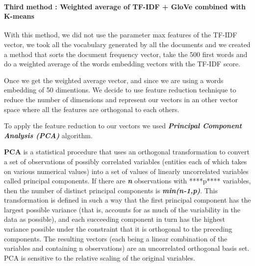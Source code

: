 \documentclass[journal,twocolumn]{IEEEtran}
\begin{document}
    \begin{figure}
        \begin{center}\end{center}
        \caption{}
        \label{}
    \end{figure}
    
    \hypertarget{third-method-weighted-average-of-tf-idf-glove-combined-with-k-means}{%
\paragraph{Third method : Weighted average of TF-IDF + GloVe combined
with
K-means}\label{third-method-weighted-average-of-tf-idf-glove-combined-with-k-means}}

With this method, we did not use the parameter max features of the
TF-IDF vector, we took all the vocabulary generated by all the documents
and we created a method that sorts the document frequency vector, take
the 500 first words and do a weighted average of the words embedding
vectors with the TF-IDF score.

Once we get the weighted average vector, and since we are using a words
embedding of 50 dimentions. We decide to use feature reduction technique
to reduce the number of dimensions and represent our vectors in an other
vector space where all the features are orthogonal to each others.

To apply the feature reduction to our vectors we used
\textbf{\emph{Principal Component Analysis (PCA)}} algorithm.

\textbf{PCA} is a statistical procedure that uses an orthogonal
transformation to convert a set of observations of possibly correlated
variables (entities each of which takes on various numerical values)
into a set of values of linearly uncorrelated variables called principal
components. If there are \textbf{\emph{n}} observations with ****p****
variables, then the number of distinct principal components is
\textbf{\emph{min(n-1,p)}}. This transformation is defined in such a way
that the first principal component has the largest possible variance
(that is, accounts for as much of the variability in the data as
possible), and each succeeding component in turn has the highest
variance possible under the constraint that it is orthogonal to the
preceding components. The resulting vectors (each being a linear
combination of the variables and containing n observations) are an
uncorrelated orthogonal basis set. PCA is sensitive to the relative
scaling of the original variables.
\end{document}
